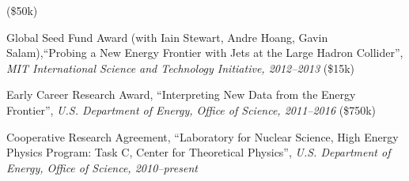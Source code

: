 (\$50k)
\item Global Seed Fund Award (with Iain Stewart, Andre Hoang, Gavin Salam),``Probing a New Energy Frontier with Jets at the Large Hadron Collider'', \textit{MIT International Science and Technology Initiative, 2012--2013}
(\$15k)
\item Early Career Research Award, ``Interpreting New Data from the Energy Frontier'', \textit{U.S. Department of Energy, Office of Science, 2011--2016}
(\$750k)
\item Cooperative Research Agreement, ``Laboratory for Nuclear Science, High Energy Physics Program: Task C, Center for Theoretical Physics'', \textit{U.S. Department of Energy, Office of Science, 2010--present}

\el
